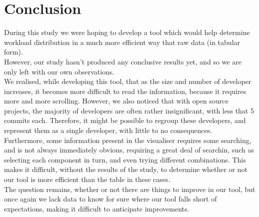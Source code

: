 \section{Conclusion}
	During this study we were hoping to develop a tool which would help determine workload distribution in a much more efficient way that raw data (in tabular form).\\
	However, our study hasn't produced any conclusive results yet, and so we are only left with our own observations.\\
	We realised, while developing this tool, that as the size and number of developer increases, it becomes more difficult to read the information, because it requires more and more scrolling. However, we also noticed that with open source projects, the majority of developers are often rather insignificant, with less that 5 commits each. Therefore, it might be possible to regroup these developers, and represent them as a single developer, with little to no consequences.\\

	Furthermore, some information present in the visualiser requires some searching, and is not always immediately obvious, requiring a great deal of searchin, such as selecting each component in turn, and even trying different combinations. This makes it difficult, without the results of the study, to determine whether or not our tool is more efficient than the table in these cases.\\

	The question remains, whether or not there are things to improve in our tool, but once again we lack data to know for sure where our tool falls short of expectations, making it difficult to anticipate improvements.